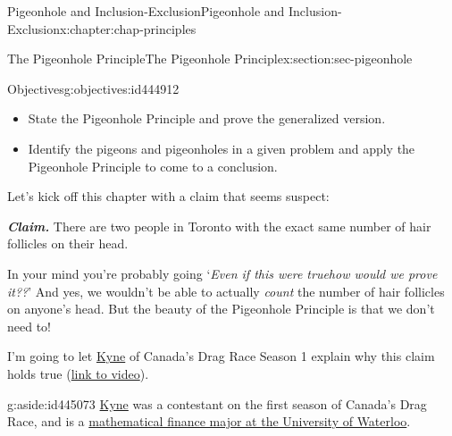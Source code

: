 \documentclass[oneside,10pt,]{book}
\newcommand{\alert}[1]{\textbf{\textit{#1}}}
\numberwithin{equation}{section}
\begin{document}
\begin{chapterptx}{Pigeonhole and Inclusion-Exclusion}{}{Pigeonhole and Inclusion-Exclusion}{}{}{x:chapter:chap-principles}
%
%
\typeout{************************************************}
\typeout{************************************************}
%
\begin{sectionptx}{The Pigeonhole Principle}{}{The Pigeonhole Principle}{}{}{x:section:sec-pigeonhole}
\begin{objectives}{Objectives}{g:objectives:id444912}
%
\begin{itemize}[label=\textbullet]
\item{}State the Pigeonhole Principle and prove the generalized version.%
\item{}Identify the pigeons and pigeonholes in a given problem and apply the Pigeonhole Principle to come to a conclusion.%
\end{itemize}
\end{objectives}
Let's kick off this chapter with a claim that seems suspect:%
\par
\alert{Claim.} There are two people in Toronto with the exact same number of hair follicles on their head.%
\par
In your mind you're probably going `\emph{Even if this were true\textellipsis{}how would we prove it??}' And yes, we wouldn't be able to actually \emph{count} the number of hair follicles on anyone's head. But the beauty of the Pigeonhole Principle is that we don't need to!%
\par
I'm going to let \href{https://twitter.com/onlinekyne}{Kyne} of Canada's Drag Race Season 1 explain why this claim holds true (\href{https://www.tiktok.com/@onlinekyne/video/6825323353256070406}{link to video}).%
\begin{aside}{}{g:aside:id445073}%
\href{https://www.onlinekyne.com/}{Kyne} was a contestant on the first season of Canada's Drag Race, and is a \href{https://uwaterloo.ca/stories/mathematics/university-waterloos-math-student-vying-become-canadas-first}{mathematical finance major at the University of Waterloo}.%
\end{aside}


\end{sectionptx}
\end{chapterptx}
\end{document}
